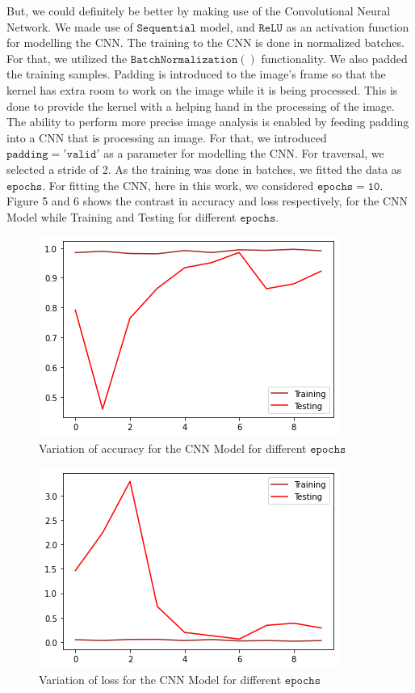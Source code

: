 \documentclass[conference]{IEEEtran}
\begin{document}
But, we could definitely be better by making use of the Convolutional Neural Network. We made use of $\mathtt{Sequential}$ model, and $\mathtt{ReLU}$ as an activation function for modelling the CNN. The training to the CNN is done in normalized batches. For that, we utilized the $\mathtt{BatchNormalization()}$ functionality. We also padded the training samples. Padding is introduced to the image's frame so that the kernel has extra room to work on the image while it is being processed. This is done to provide the kernel with a helping hand in the processing of the image. The ability to perform more precise image analysis is enabled by feeding padding into a CNN that is processing an image. For that, we introduced $\mathtt{padding='valid'}$ as a parameter for modelling the CNN. For traversal, we selected a stride of 2. As the training was done in batches, we fitted the data as $\mathtt{epochs}$. For fitting the CNN, here in this work, we considered $\mathtt{epochs=10}$. Figure 5 and 6 shows the contrast in accuracy and loss respectively, for the CNN Model while Training and Testing for different $\mathtt{epochs}$.
\begin{figure}[htbp]
\label{fig5}
\centerline{\includegraphics[width = \linewidth]{5}}
\caption{Variation of accuracy for the CNN Model for different $\mathtt{epochs}$}
\end{figure}
\begin{figure}[htbp]
\label{fig6}
\centerline{\includegraphics[width = \linewidth]{6}}
\caption{Variation of loss for the CNN Model for different $\mathtt{epochs}$}
\end{figure}
\end{document}
